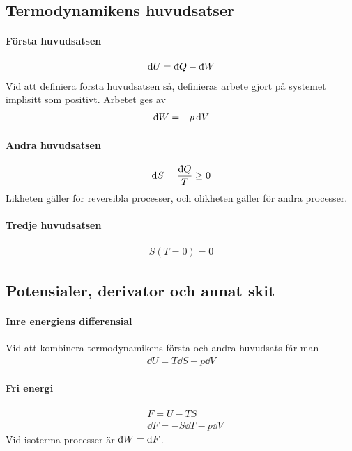 \subsection{Termodynamikens huvudsatser}

\paragraph{Första huvudsatsen}
\begin{align*}
	\dd{U} = \idd{Q} - \idd{W}
\end{align*}
Vid att definiera första huvudsatsen så, definieras arbete gjort på systemet implisitt som positivt. Arbetet ges av
\begin{align*}
	\idd{W} = -p\dd{V}
\end{align*}

\paragraph{Andra huvudsatsen}
\begin{align*}
	\dd{S} = \frac{\idd{Q}}{T} \geq 0
\end{align*}
Likheten gäller för reversibla processer, och olikheten gäller för andra processer.

\paragraph{Tredje huvudsatsen}
\begin{align*}
	S(T = 0) = 0
\end{align*}

\subsection{Potensialer, derivator och annat skit}

\paragraph{Inre energiens differensial}
Vid att kombinera termodynamikens första och andra huvudsats får man
\begin{align*}
	\dd{U} = T\dd{S} - p\dd{V}
\end{align*}

\paragraph{Fri energi}
\begin{align*}
	& F = U -TS\\
	& \dd{F} = -S\dd{T} - p\dd{V}
\end{align*}
Vid isoterma processer är $\idd{W} = \dd{F}$.


